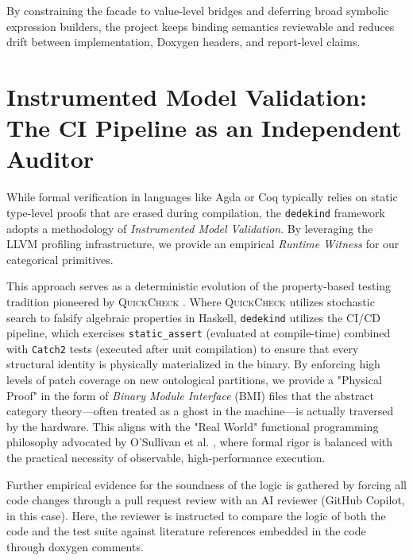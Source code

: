 \documentclass[11pt, a4paper]{report}
\begin{document}
By constraining the facade to value-level bridges and deferring broad symbolic expression builders, the project keeps binding semantics reviewable and reduces drift between implementation, Doxygen headers, and report-level claims.

\section{Instrumented Model Validation: The CI Pipeline as an Independent Auditor}
While formal verification in languages like Agda or Coq typically relies on static type-level proofs that are erased during compilation, the \texttt{dedekind} framework adopts a methodology of \emph{Instrumented Model Validation}. By leveraging the LLVM profiling infrastructure, we provide an empirical \emph{Runtime Witness} for our categorical primitives.


This approach serves as a deterministic evolution of the property-based testing tradition pioneered by \textsc{QuickCheck} \cite{ClaessenHughes2000}.
Where \textsc{QuickCheck} utilizes stochastic search to falsify algebraic properties in Haskell, \texttt{dedekind} utilizes the CI/CD pipeline, which exercises \texttt{static\_assert} (evaluated at compile-time) combined with \texttt{Catch2} tests (executed after unit compilation) to ensure that every structural identity is physically materialized in the binary. By enforcing high levels of patch coverage on new ontological partitions, we provide a "Physical Proof" in the form of \emph{Binary Module Interface} (BMI) files that the abstract category theory—often treated as a ghost in the machine—is actually traversed by the hardware.
This aligns with the "Real World" functional programming philosophy advocated by O'Sullivan et al. \cite{OSullivan2008}, where formal rigor is balanced with the practical necessity of observable, high-performance execution.

Further empirical evidence for the soundness of the logic is gathered by forcing all code changes through a pull request review with an AI reviewer (GitHub Copilot, in this case).
Here, the reviewer is instructed to compare the logic of both the code and the test suite against literature references embedded in the code through doxygen comments.
\end{document}
